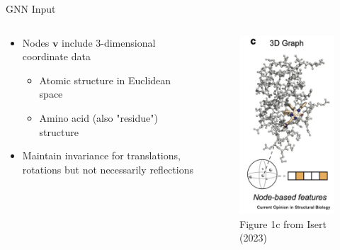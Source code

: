\documentclass{beamer}
\newcommand{\node}{v}
\begin{document}
\begin{frame}{GNN Input}
    \begin{columns}
        \begin{column}{0.65\textwidth}
            \begin{itemize}\setlength\itemsep{6mm}
                \item Nodes $\mathbf{\node}$ include 3-dimensional coordinate data 
                \begin{itemize}
                \item Atomic structure in Euclidean space 
                \item Amino acid (also "residue") structure 
                \end{itemize}
                \item Maintain invariance for translations, rotations but not necessarily reflections 
            \end{itemize}            
        \end{column}
        \begin{column}{0.35\textwidth}
            \begin{figure}
                \centering 
                \includegraphics[scale=0.55]{Isert_2023_ModelsSBDD_3DGraph.png}
            \caption{Figure 1c from Isert (2023) \cite{isert_structure-based_2023}}
        \end{figure}
                    
        \end{column}
    \end{columns}
\end{frame}
\end{document}
